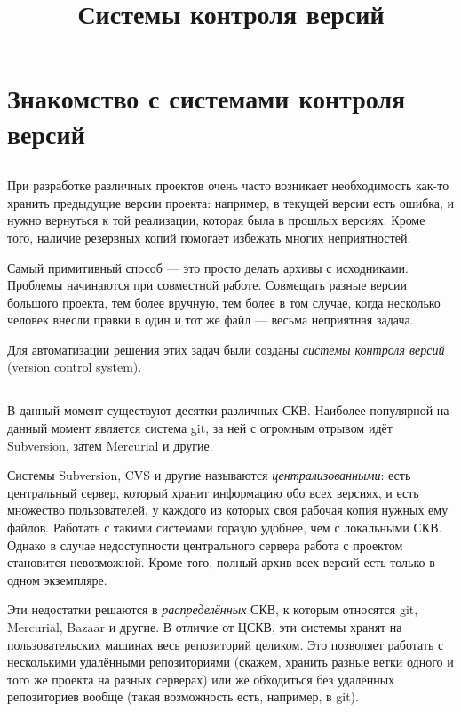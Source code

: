 \documentclass{article}
\title{Системы контроля версий}
\date{}
\begin{document}
\maketitle
\tableofcontents

\section{Знакомство с системами контроля версий}
\subsection{}
При разработке различных проектов очень часто возникает необходимость как-то хранить предыдущие версии проекта: например, в текущей версии есть ошибка, и нужно вернуться к той реализации, которая была в прошлых версиях. Кроме того, наличие резервных копий помогает избежать многих неприятностей.

Самый примитивный способ --- это просто делать архивы с исходниками. Проблемы начинаются при совместной работе. Совмещать разные версии большого проекта, тем более вручную, тем более в том случае, когда несколько человек внесли правки в один и тот же файл --- весьма неприятная задача.

Для автоматизации решения этих задач были созданы \emph{системы контроля версий} (version control system).

\subsection{}
В данный момент существуют десятки различных СКВ. Наиболее популярной на данный момент является система git, за ней с огромным отрывом идёт Subversion, затем Mercurial и другие.

Системы Subversion, CVS и другие называются \emph{централизованными}: есть центральный сервер, который хранит информацию обо всех версиях, и есть множество пользователей, у каждого из которых своя рабочая копия нужных ему файлов. Работать с такими системами гораздо удобнее, чем с локальными СКВ. Однако в случае недоступности центрального сервера работа с проектом становится невозможной. Кроме того, полный архив всех версий есть только в одном экземпляре.

Эти недостатки решаются в \emph{распределённых} СКВ, к которым относятся git, Mercurial, Bazaar и другие. В отличие от ЦСКВ, эти системы хранят на пользовательских машинах весь репозиторий целиком. Это позволяет работать с несколькими удалёнными репозиториями (скажем, хранить разные ветки одного и того же проекта на разных серверах) или же обходиться без удалённых репозиториев вообще (такая возможность есть, например, в git).
\end{document}
